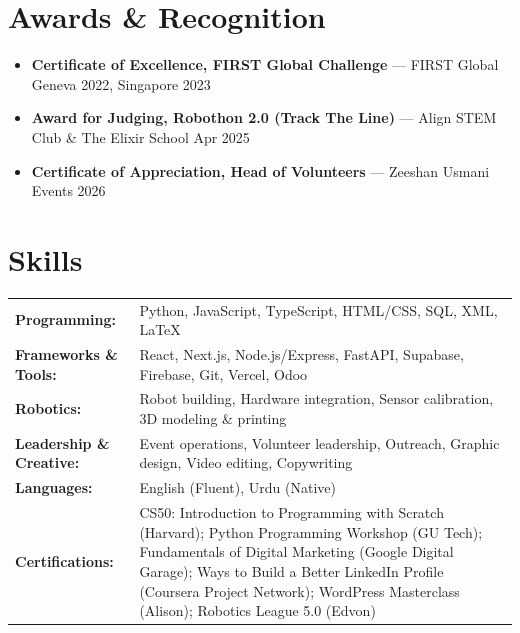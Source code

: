 \documentclass[10pt,a4paper]{article}
\begin{document}
\section{Awards \& Recognition}
\begin{itemize}
  \item \textbf{Certificate of Excellence, FIRST Global Challenge} --- FIRST Global \hfill Geneva 2022, Singapore 2023
  \item \textbf{Award for Judging, Robothon 2.0 (Track The Line)} --- Align STEM Club \& The Elixir School \hfill Apr 2025
  \item \textbf{Certificate of Appreciation, Head of Volunteers} --- Zeeshan Usmani Events \hfill 2026
\end{itemize}

\section{Skills}
\begin{tabularx}{\linewidth}{@{}l X@{}}
\textbf{Programming:} & Python, JavaScript, TypeScript, HTML/CSS, SQL, XML, LaTeX \\
\textbf{Frameworks \& Tools:} & React, Next.js, Node.js/Express, FastAPI, Supabase, Firebase, Git, Vercel, Odoo \\
\textbf{Robotics:} & Robot building, Hardware integration, Sensor calibration, 3D modeling \& printing \\
\textbf{Leadership \& Creative:} & Event operations, Volunteer leadership, Outreach, Graphic design, Video editing, Copywriting \\
\textbf{Languages:} & English (Fluent), Urdu (Native) \\
\textbf{Certifications:} & CS50: Introduction to Programming with Scratch (Harvard); Python Programming Workshop (GU Tech); Fundamentals of Digital Marketing (Google Digital Garage); Ways to Build a Better LinkedIn Profile (Coursera Project Network); WordPress Masterclass (Alison); Robotics League 5.0 (Edvon) \\
\end{tabularx}
\end{document}

